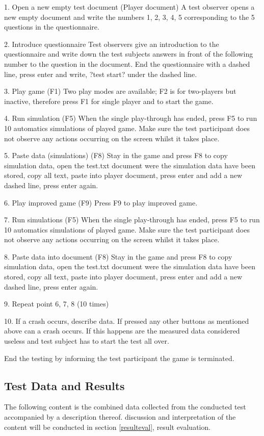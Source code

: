 1.	Open a new empty test document (Player document)
A test observer opens a new empty document and write the numbers 1, 2, 3, 4, 5 corresponding to the 5 questions in the questionnaire.

2.	Introduce questionnaire
Test observers give an introduction to the questionnaire and write down the test subjects answers in front of the following number to the question in the document. 
End the questionnaire with a dashed line, press enter and write, ?test start? under the dashed line.

3.	Play game (F1)
Two play modes are available; F2 is for two-players but inactive, therefore press F1 for single player and to start the game.

4.	Run simulation (F5)
When the single play-through has ended, press F5 to run 10 automatics simulations of played game. Make sure the test participant does not observe any actions occurring on the screen whilst it takes place. 

5.	Paste data (simulations) (F8)
Stay in the game and press F8 to copy simulation data, open the test.txt document were the simulation data have been stored, copy all text, paste into player document, press enter and add a new dashed line, press enter again. 

6.	Play improved game (F9)
Press F9 to play improved game. 

7.	Run simulations (F5)
When the single play-through has ended, press F5 to run 10 automatics simulations of played game. Make sure the test participant does not observe any actions occurring on the screen whilst it takes place.

8.	Paste data into document (F8)
Stay in the game and press F8 to copy simulation data, open the test.txt document were the simulation data have been stored, copy all text, paste into player document, press enter and add a new dashed line, press enter again. 

9.	Repeat point 6, 7, 8 (10 times)

10.	If a crash occurs, describe data.
If pressed any other buttons as mentioned above can a crash occurs. If this happens are the measured data considered useless and test subject has to start the test all over.

End the testing by informing the test participant the game is terminated.



\newpage
\subsection{Test Data and Results}
The following content is the combined data collected from the conducted test accompanied by a description thereof. discussion and interpretation of the content will be conducted in section \ref{resulteval}, result evaluation.

